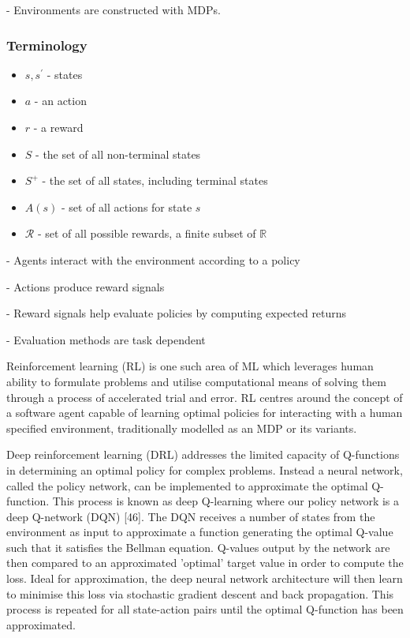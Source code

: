 \documentclass[runningheads]{llncs}
\begin{document}
- Environments are constructed with MDPs. 
\subsubsection{Terminology}
\begin{itemize}
	\item $s, s^{\prime}$ - states
	\item $a$ - an action
	\item $r$ - a reward
	\item $S$ - the set of all non-terminal states
	\item $S^{+}$ - the set of all states, including terminal states
	\item $A(s)$ - set of all actions for state $s$
	\item $\mathcal{R}$ - set of all possible rewards, a finite subset of $\mathbb{R}$

\end{itemize}

- Agents interact with the environment according to a policy

- Actions produce reward signals

- Reward signals help evaluate policies by computing expected returns

- Evaluation methods are task dependent


Reinforcement learning (RL) is one such area of ML which leverages human ability to formulate problems and utilise computational means of solving them through a process of accelerated trial and error. RL centres around the concept of a software agent capable of learning optimal policies for interacting with a human specified environment, traditionally modelled as an MDP or its variants. 

Deep reinforcement learning (DRL) addresses the limited capacity of Q-functions in determining an optimal policy for complex problems. Instead a neural network, called the policy network, can be implemented to approximate the optimal Q-function. This process is known as deep Q-learning where our policy network is a deep Q-network (DQN) [46]. The DQN receives a number of states from the environment as input to approximate a function generating the optimal Q-value such that it satisfies the Bellman equation. Q-values output by the network are then compared to an approximated 'optimal' target value in order to compute the loss. Ideal for approximation, the deep neural network architecture will then learn to minimise this loss via stochastic gradient descent and back propagation. This process is repeated for all state-action pairs until the optimal Q-function has been approximated. 
\end{document}
